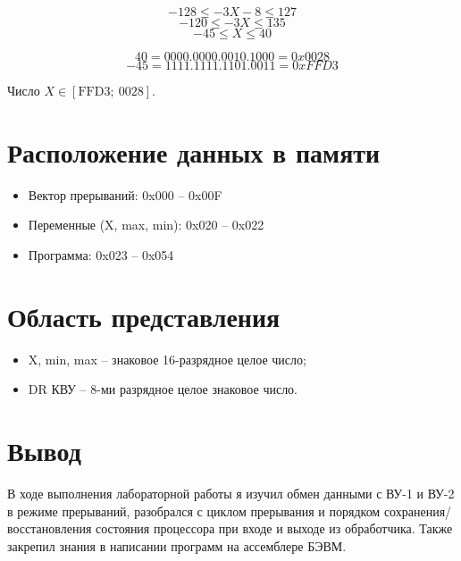 \documentclass[12pt,a4paper]{article}
\begin{document}
\[
-128 \le -3X-8 \le 127
\]
\[
-120 \le -3X \le 135
\]
\[
-45 \le X \le 40
\]

\[
40 = 0000.0000.0010.1000 = 0x0028
\]
\[
-45 = 1111.1111.1101.0011 = 0xFFD3
\]

Число $X \in [\text{FFD3};\ 0028]$.

\section*{Расположение данных в памяти}

\begin{itemize}
    \item Вектор прерываний: 0x000 -- 0x00F
    \item Переменные (X, max, min): 0x020 -- 0x022
    \item Программа: 0x023 – 0x054
\end{itemize}

\section*{Область представления}

\begin{itemize}
    \item X, min, max -- знаковое 16-разрядное целое число;
    \item DR КВУ -- 8-ми разрядное целое знаковое число.
\end{itemize}

\section*{Вывод}

В ходе выполнения лабораторной работы я изучил обмен данными с ВУ-1 и ВУ-2 в режиме прерываний, разобрался с циклом прерывания и порядком сохранения/восстановления состояния процессора при входе и выходе из обработчика. Также закрепил знания в написании программ на ассемблере БЭВМ.

\end{document}
